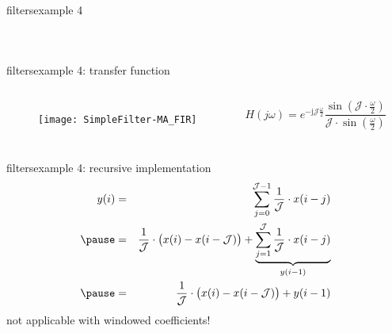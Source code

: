 	\begin{frame}{filters}{example 4}
        \begin{columns}
        \begin{figure}
			\begin{center}
                
			\end{center}
        \end{figure}
        
        \end{columns}
	\end{frame}
	\begin{frame}{filters}{example 4: transfer function}
        \vspace{-10mm}
        \begin{columns}
		\begin{figure}
			\centerline{\texttt{[image: SimpleFilter-MA\_FIR]}}
		\end{figure}
    	\begin{equation*}
    		H(j\omega) = e^{-\mathrm{j}\mathcal{J}\frac{\omega}{2}}\frac{\sin\left(\mathcal{J}\cdot\frac{\omega}{2} \right)}{\mathcal{J}\cdot\sin\left(\frac{\omega}{2} \right)}
    	\end{equation*}
        \end{columns}

	\end{frame}	
	\begin{frame}{filters}{example 4: recursive implementation}
		\begin{eqnarray*}
			y(i) &=& \sum\limits_{j=0}^{\mathcal{J}-1}{\frac{1}{\mathcal{J}}\cdot x(i-j)}\nonumber\\
			\pause
			&=& \frac{1}{\mathcal{J}}\cdot \big(x(i) - x(i-\mathcal{J})\big) + \underbrace{\sum\limits_{j=1}^{\mathcal{J}}{\frac{1}{\mathcal{J}}\cdot x(i-j)}}_{y(i-1)}\nonumber\\
			\pause
			&=& \frac{1}{\mathcal{J}}\cdot \big(x(i) - x(i-\mathcal{J})\big) + y(i-1) 
		\end{eqnarray*} 
		\pause
		\textcolor{gtgold}{not applicable with windowed coefficients!}
	\end{frame}
